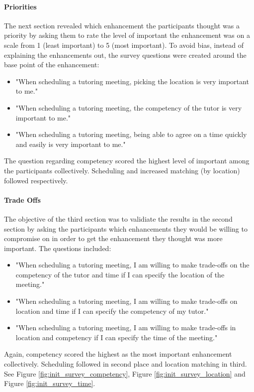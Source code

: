 \paragraph{Priorities} The next section revealed which enhancement the
participants thought was a priority by asking them to rate the level of
important the enhancement was on a scale from 1 (least important) to 5 (most
important). To avoid bias, instead of explaining the enhancements out, the
survey questions were created around the base point of the enhancement:
\begin{itemize}
\item "When scheduling a tutoring meeting, picking the location is very
  important to me."
\item "When scheduling a tutoring meeting, the competency of the tutor is very
  important to me."
\item "When scheduling a tutoring meeting, being able to agree on a time quickly
  and easily is very important to me."
\end{itemize} The question regarding competency scored the highest level of
important among the participants collectively. Scheduling and increased matching
(by location) followed respectively.

\paragraph{Trade Offs} The objective of the third section was to validiate the
results in the second section by asking the participants which enhancements they
would be willing to compromise on in order to get the enhancement they thought
was more important. The questions included:
\begin{itemize}
\item "When scheduling a tutoring meeting, I am willing to make trade-offs on
  the competency of the tutor and time if I can specify the location of the
  meeting."
\item "When scheduling a tutoring meeting, I am willing to make trade-offs on
  location and time if I can specify the competency of my tutor."
\item "When scheduling a tutoring meeting, I am willing to make trade-offs in
  location and competency if I can specify the time of the meeting."
\end{itemize}
Again, competency scored the highest as the most important enhancement
collectively. Scheduling followed in second place and location matching in
third. See Figure \ref{fig:init_survey_competency}, Figure
\ref{fig:init_survey_location} and Figure \ref{fig:init_survey_time}.

